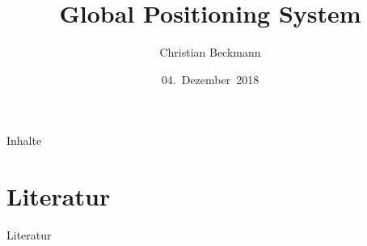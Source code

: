 
\newcommand{\ch}{$\checkmark$}
\title{Global Positioning System}
\author[Christian~Beckmann]{Christian Beckmann}
\date{04.~Dezember~2018}


    \maketitle
    \begin{frame}{Inhalte}
        \tableofcontents
    \end{frame}
    
    
    
    
    
    
    \section{Literatur}
    \begin{frame}{Literatur}
        \nocite{*}
        \printbibliography
    \end{frame}

